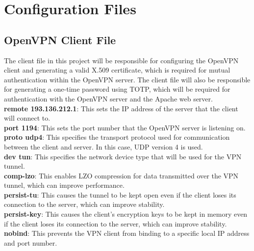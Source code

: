 \documentclass[12pt]{article}
\begin{document}
\newpage

\section{Configuration Files}

\subsection{OpenVPN Client File}

The client file in this project will be responsible for configuring the OpenVPN client and generating a valid X.509 certificate, which is required for mutual authentication within the OpenVPN server. The client file will also be responsible for generating a one-time password using TOTP, which will be required for authentication with the OpenVPN server and the Apache web server.\\



\textbf {remote 193.136.212.1}: This sets the IP address of the server that the client will connect to.\\

\textbf{port 1194}: This sets the port number that the OpenVPN server is listening on.\\

\textbf{proto udp4}: This specifies the transport protocol used for communication between the client and server. In this case, UDP version 4 is used.\\

\textbf{dev tun}: This specifies the network device type that will be used for the VPN tunnel.\\

\textbf{comp-lzo}: This enables LZO compression for data transmitted over the VPN tunnel, which can improve performance.\\

\textbf{persist-tu}: This causes the tunnel to be kept open even if the client loses its connection to the server, which can improve stability.\\

\textbf{persist-key}: This causes the client's encryption keys to be kept in memory even if the client loses its connection to the server, which can improve stability.\\

\textbf{nobind}: This prevents the VPN client from binding to a specific local IP address and port number.\\
\end{document}
